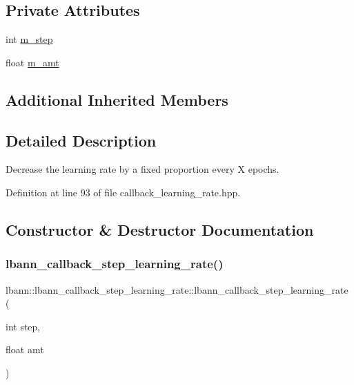 \subsection*{Private Attributes}
\begin{DoxyCompactItemize}
\item 
int \hyperlink{classlbann_1_1lbann__callback__step__learning__rate_a804bffdc6bcc1e1f43dc068db852b993}{m\+\_\+step}
\item 
float \hyperlink{classlbann_1_1lbann__callback__step__learning__rate_ab6f5430cf862ec67392dc0f69ced81e6}{m\+\_\+amt}
\end{DoxyCompactItemize}
\subsection*{Additional Inherited Members}


\subsection{Detailed Description}
Decrease the learning rate by a fixed proportion every X epochs. 

Definition at line 93 of file callback\+\_\+learning\+\_\+rate.\+hpp.



\subsection{Constructor \& Destructor Documentation}
\mbox{\label{classlbann_1_1lbann__callback__step__learning__rate_acaf6b1a65c8734b21a62a3c1f16447ca}} 
\subsubsection{\texorpdfstring{lbann\+\_\+callback\+\_\+step\+\_\+learning\+\_\+rate()}{lbann\_callback\_step\_learning\_rate()}\hspace{0.1cm}{\footnotesize\ttfamily [1/3]}}
{\footnotesize\ttfamily lbann\+::lbann\+\_\+callback\+\_\+step\+\_\+learning\+\_\+rate\+::lbann\+\_\+callback\+\_\+step\+\_\+learning\+\_\+rate (\begin{DoxyParamCaption}\item[{int}]{step,  }\item[{float}]{amt }\end{DoxyParamCaption})}

